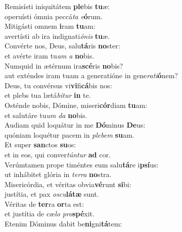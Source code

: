 \evenverse Remisísti iniquitátem \textbf{ple}bis \textbf{tu}æ:~\*\\
\evenverse operuísti ómnia peccá\textit{ta} \textit{e}\textbf{ó}rum.\\
\oddverse Mitigásti omnem \textbf{i}ram \textbf{tu}am:~\*\\
\oddverse avertísti ab ira indignati\textit{ó}\textit{nis} \textbf{tu}æ.\\
\evenverse Convérte nos, Deus, salu\textbf{tá}ris \textbf{no}ster:~\*\\
\evenverse et avérte iram tu\textit{am} \textit{a} \textbf{no}bis.\\
\oddverse Numquid in ætérnum ira\textbf{scé}ris \textbf{no}bis?~\*\\
\oddverse aut exténdes iram tuam a generatióne in gene\textit{ra}\textit{ti}\textbf{ó}nem?\\
\evenverse Deus, tu convérsus vi\textbf{vi}fi\textbf{cá}bis nos:~\*\\
\evenverse et plebs tua lætá\textit{bi}\textit{tur} \textbf{in} te.\\
\oddverse Osténde nobis, Dómine, miseri\textbf{cór}diam \textbf{tu}am:~\*\\
\oddverse et salutáre tu\textit{um} \textit{da} \textbf{no}bis.\\
\evenverse Audiam quid loquátur in me \textbf{Dó}minus \textbf{De}us:~\*\\
\evenverse quóniam loquétur pacem in \textit{ple}\textit{bem} \textbf{su}am.\\
\oddverse Et super \textbf{san}ctos \textbf{su}os:~\*\\
\oddverse et in eos, qui conver\textit{tún}\textit{tur} \textbf{ad} cor.\\
\evenverse Verúmtamen prope timéntes eum salu\textbf{tá}re i\textbf{psí}us:~\*\\
\evenverse ut inhábitet glória in \textit{ter}\textit{ra} \textbf{no}stra.\\
\oddverse Misericórdia, et véritas obvia\textbf{vé}runt \textbf{si}bi:~\*\\
\oddverse justítia, et pax \textit{o}\textit{scu}\textbf{lá}\textbf{tæ} sunt.\\
\evenverse Véritas de \textbf{ter}ra \textbf{or}ta est:~\*\\
\evenverse et justítia de cæ\textit{lo} \textit{pro}\textbf{spé}xit.\\
\oddverse Etenim Dóminus dabit be\textbf{ni}gni\textbf{tá}tem:~\*\\
